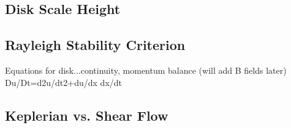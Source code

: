 \subsection{Disk Scale Height}

\subsection{Rayleigh Stability Criterion}
Equations for disk...continuity, momentum balance (will add B fields later)
Du/Dt=d2u/dt2+du/dx dx/dt
\subsection{Keplerian vs. Shear Flow}

